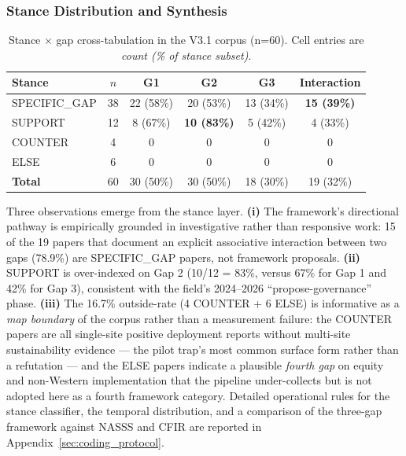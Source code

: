 \subsubsection{Stance Distribution and Synthesis}
\label{sec:stance_dist}

\begin{table}[t]
  \centering
  \caption{Stance $\times$ gap cross-tabulation in the
  V3.1 corpus (n=60). Cell entries are
  \textit{count (\% of stance subset)}.}
  \label{tab:stance_gap}
  \begin{tabular}{lccccc}
    \toprule
    \textbf{Stance} & $n$ & \textbf{G1} & \textbf{G2} & \textbf{G3} & \textbf{Interaction} \\
    \midrule
    SPECIFIC\_GAP  & 38 & 22 (58\%) & 20 (53\%) & 13 (34\%) & \textbf{15 (39\%)} \\
    SUPPORT        & 12 &  8 (67\%) & \textbf{10 (83\%)} &  5 (42\%) &  4 (33\%) \\
    COUNTER        &  4 &  0        &  0        &  0        &  0        \\
    ELSE           &  6 &  0        &  0        &  0        &  0        \\
    \midrule
    \textbf{Total} & 60 & 30 (50\%) & 30 (50\%) & 18 (30\%) & 19 (32\%) \\
    \bottomrule
  \end{tabular}
\end{table}

Three observations emerge from the stance layer.
\textbf{(i)} The framework's directional pathway is empirically
grounded in investigative rather than responsive work: 15 of the 19
papers that document an explicit associative interaction between two gaps
(78.9\%) are SPECIFIC\_GAP papers, not framework proposals.
\textbf{(ii)} SUPPORT is over-indexed on Gap 2 (10/12 = 83\%, versus
67\% for Gap 1 and 42\% for Gap 3), consistent with the field's
2024--2026 ``propose-governance'' phase. \textbf{(iii)} The 16.7\%
outside-rate (4 COUNTER + 6 ELSE) is informative as a \textit{map
boundary} of the corpus rather than a measurement failure: the COUNTER
papers are all single-site positive deployment reports without
multi-site sustainability evidence --- the pilot trap's most common
surface form rather than a refutation --- and the ELSE papers
indicate a plausible \textit{fourth gap} on equity and non-Western
implementation that the pipeline under-collects but is not adopted
here as a fourth framework category. Detailed operational rules for
the stance classifier, the temporal distribution, and a comparison of
the three-gap framework against NASSS and CFIR are reported in
Appendix~\ref{sec:coding_protocol}.


